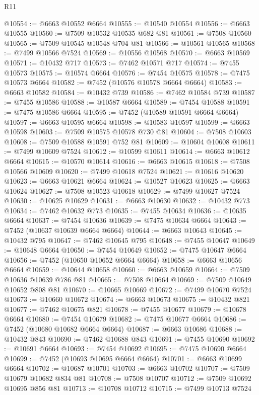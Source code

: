 \begin{lexlean}{R11}
\begin{coremodule}
@10554 := @6663 @10552 @6664
@10555 := @10540 @10554
@10556 := @6663 @10555
@10560 := @7509 @10532 @10535 @682 @81
@10561 := @7508 @10560
@10565 := @7509 @10545 @10548 @704 @81
@10566 := @10561 @10565
@10568 := @7499 @10566 @7524
@10569 := @10556 @10568
@10570 := @6663 @10569
@10571 := @10432 @717
@10573 := @7462 @10571 @717
@10574 := @7455 @10573
@10575 := @10574 @6664
@10576 := @7454 @10575
@10578 := @7475 @10573 @6664
@10582 := @7452 (@10576 @10578 @6664 @6664)
@10583 := @6663 @10582
@10584 := @10432 @739
@10586 := @7462 @10584 @739
@10587 := @7455 @10586
@10588 := @10587 @6664
@10589 := @7454 @10588
@10591 := @7475 @10586 @6664
@10595 := @7452 (@10589 @10591 @6664 @6664)
@10597 := @6663 @10595 @6664
@10598 := @10583 @10597
@10599 := @6663 @10598
@10603 := @7509 @10575 @10578 @730 @81
@10604 := @7508 @10603
@10608 := @7509 @10588 @10591 @752 @81
@10609 := @10604 @10608
@10611 := @7499 @10609 @7524
@10612 := @10599 @10611
@10614 := @6663 @10612 @6664
@10615 := @10570 @10614
@10616 := @6663 @10615
@10618 := @7508 @10566 @10609
@10620 := @7499 @10618 @7524
@10621 := @10616 @10620
@10623 := @6663 @10621 @6664
@10624 := @10527 @10623
@10625 := @6663 @10624
@10627 := @7508 @10523 @10618
@10629 := @7499 @10627 @7524
@10630 := @10625 @10629
@10631 := @6663 @10630
@10632 := @10432 @773
@10634 := @7462 @10632 @773
@10635 := @7455 @10634
@10636 := @10635 @6664
@10637 := @7454 @10636
@10639 := @7475 @10634 @6664
@10643 := @7452 (@10637 @10639 @6664 @6664)
@10644 := @6663 @10643
@10645 := @10432 @795
@10647 := @7462 @10645 @795
@10648 := @7455 @10647
@10649 := @10648 @6664
@10650 := @7454 @10649
@10652 := @7475 @10647 @6664
@10656 := @7452 (@10650 @10652 @6664 @6664)
@10658 := @6663 @10656 @6664
@10659 := @10644 @10658
@10660 := @6663 @10659
@10664 := @7509 @10636 @10639 @786 @81
@10665 := @7508 @10664
@10669 := @7509 @10649 @10652 @808 @81
@10670 := @10665 @10669
@10672 := @7499 @10670 @7524
@10673 := @10660 @10672
@10674 := @6663 @10673
@10675 := @10432 @821
@10677 := @7462 @10675 @821
@10678 := @7455 @10677
@10679 := @10678 @6664
@10680 := @7454 @10679
@10682 := @7475 @10677 @6664
@10686 := @7452 (@10680 @10682 @6664 @6664)
@10687 := @6663 @10686
@10688 := @10432 @843
@10690 := @7462 @10688 @843
@10691 := @7455 @10690
@10692 := @10691 @6664
@10693 := @7454 @10692
@10695 := @7475 @10690 @6664
@10699 := @7452 (@10693 @10695 @6664 @6664)
@10701 := @6663 @10699 @6664
@10702 := @10687 @10701
@10703 := @6663 @10702
@10707 := @7509 @10679 @10682 @834 @81
@10708 := @7508 @10707
@10712 := @7509 @10692 @10695 @856 @81
@10713 := @10708 @10712
@10715 := @7499 @10713 @7524

\end{coremodule}
\end{lexlean}
